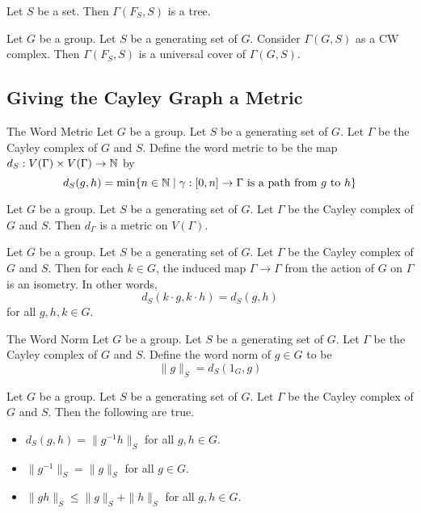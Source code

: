 \documentclass[a4paper]{article}
\begin{document}
\begin{prp}{}{} Let $S$ be a set. Then $\Gamma(F_S,S)$ is a tree. 
\end{prp}

\begin{prp}{}{} Let $G$ be a group. Let $S$ be a generating set of $G$. Consider $\Gamma(G,S)$ as a CW complex. Then $\Gamma(F_S,S)$ is a universal cover of $\Gamma(G,S)$. 
\end{prp}

\subsection{Giving the Cayley Graph a Metric}
\begin{defn}{The Word Metric}{} Let $G$ be a group. Let $S$ be a generating set of $G$. Let $\Gamma$ be the Cayley complex of $G$ and $S$. Define the word metric to be the map $d_S:V(\Gamma)\times V(\Gamma)\to\mathbb{N}$ by $$d_S(g,h)=\min\{n\in\mathbb{N}\;|\;\gamma:[0,n]\to\Gamma\text{ is a path from }g\text{ to }h\}$$
\end{defn}

\begin{lmm}{}{} Let $G$ be a group. Let $S$ be a generating set of $G$. Let $\Gamma$ be the Cayley complex of $G$ and $S$. Then $d_\Gamma$ is a metric on $V(\Gamma)$. 
\end{lmm}

\begin{prp}{}{} Let $G$ be a group. Let $S$ be a generating set of $G$. Let $\Gamma$ be the Cayley complex of $G$ and $S$. Then for each $k\in G$, the induced map $\Gamma\to\Gamma$ from the action of $G$ on $\Gamma$ is an isometry. In other words, $$d_S(k\cdot g,k\cdot h)=d_S(g,h)$$ for all $g,h,k\in G$. 
\end{prp}

\begin{defn}{The Word Norm}{} Let $G$ be a group. Let $S$ be a generating set of $G$. Let $\Gamma$ be the Cayley complex of $G$ and $S$. Define the word norm of $g\in G$ to be $$\|g\|_S=d_S(1_G,g)$$
\end{defn}

\begin{lmm}{}{} Let $G$ be a group. Let $S$ be a generating set of $G$. Let $\Gamma$ be the Cayley complex of $G$ and $S$. Then the following are true. 
\begin{itemize}
\item $d_S(g,h)=\|g^{-1}h\|_S$ for all $g,h\in G$. 
\item $\|g^{-1}\|_S=\|g\|_S$ for all $g\in G$. 
\item $\|gh\|_S\leq\|g\|_S+\|h\|_S$ for all $g,h\in G$. 
\end{itemize}
\end{lmm}
\end{document}
